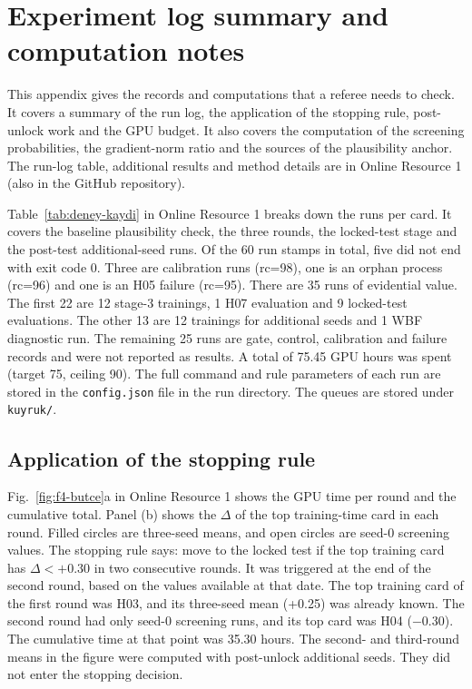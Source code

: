 \section{Experiment log summary and computation notes}\label{sec:deney-kaydi}

This appendix gives the records and computations that a referee needs to check. It covers a summary of the run log, the application of the stopping rule, post-unlock work and the GPU budget. It also covers the computation of the screening probabilities, the gradient-norm ratio and the sources of the plausibility anchor. The run-log table, additional results and method details are in Online Resource 1 (also in the GitHub repository).

Table~\ref{tab:deney-kaydi} in Online Resource 1 breaks down the runs per card. It covers the baseline plausibility check, the three rounds, the locked-test stage and the post-test additional-seed runs. Of the 60 run stamps in total, five did not end with exit code 0. Three are calibration runs (rc=98), one is an orphan process (rc=96) and one is an H05 failure (rc=95). There are 35 runs of evidential value. The first 22 are 12 stage-3 trainings, 1 H07 evaluation and 9 locked-test evaluations. The other 13 are 12 trainings for additional seeds and 1 WBF diagnostic run. The remaining 25 runs are gate, control, calibration and failure records and were not reported as results. A total of 75.45 GPU hours was spent (target 75, ceiling 90). The full command and rule parameters of each run are stored in the \texttt{config.json} file in the run directory. The queues are stored under \texttt{kuyruk/}.

\subsection{Application of the stopping rule}\label{sec:ek-durma}
Fig.~\ref{fig:f4-butce}a in Online Resource 1 shows the GPU time per round and the cumulative total. Panel (b) shows the $\Delta$ of the top training-time card in each round. Filled circles are three-seed means, and open circles are seed-0 screening values. The stopping rule says: move to the locked test if the top training card has $\Delta<+0.30$ in two consecutive rounds. It was triggered at the end of the second round, based on the values available at that date. The top training card of the first round was H03, and its three-seed mean (+0.25) was already known. The second round had only seed-0 screening runs, and its top card was H04 ($-$0.30). The cumulative time at that point was 35.30 hours. The second- and third-round means in the figure were computed with post-unlock additional seeds. They did not enter the stopping decision.

